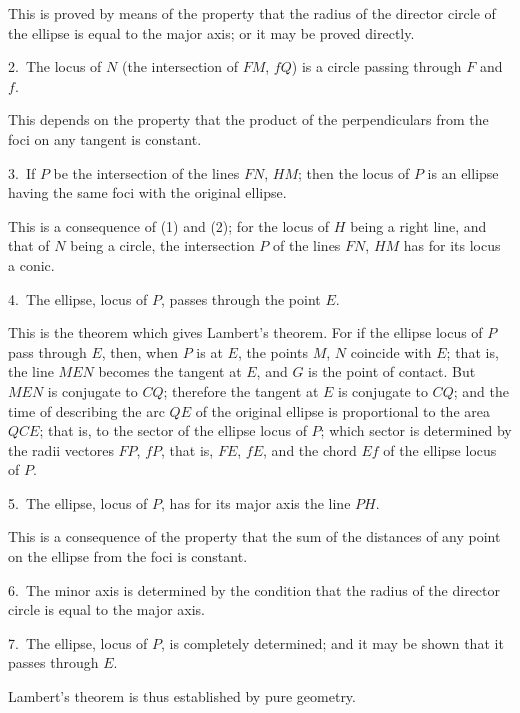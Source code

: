 \documentclass[11pt,a4paper]{book}
\providecommand{\mypar}{\par}
\begin{document}
{{\mypar
This is proved by means of the property that the radius of the director circle
of the ellipse is equal to the major axis; or it may be proved directly.

\mypar
2.~The locus of $N$ (the intersection of $FM$, $fQ$) is a circle passing
through $F$ and $f$.

\mypar
This depends on the property that the product of the perpendiculars from the
foci on any tangent is constant.

\mypar
3.~If $P$ be the intersection of the lines $FN$, $HM$; then the locus of $P$
is an ellipse having the same foci with the original ellipse.

\mypar
This is a consequence of (1) and (2); for the locus of $H$ being a right line,
and that of $N$ being a circle, the intersection $P$ of the lines $FN$, $HM$
has for its locus a conic.

\mypar
4.~The ellipse, locus of $P$, passes through the point $E$.

\mypar
This is the theorem which gives Lambert's theorem. For if the ellipse locus
of $P$ pass through $E$, then, when $P$ is at $E$, the points $M$, $N$ coincide
with $E$; that is, the line $MEN$ becomes the tangent at $E$, and $G$ is the
point of contact. But $MEN$ is conjugate to $CQ$; therefore the tangent at $E$
is conjugate to $CQ$; and the time of describing the arc $QE$ of the original
ellipse is proportional to the area $QCE$; that is, to the sector of the
ellipse locus of $P$; which sector is determined by the radii vectores $FP$,
$fP$, that is, $FE$, $fE$, and the chord $Ef$ of the ellipse locus of $P$.

\mypar
5.~The ellipse, locus of $P$, has for its major axis the line $PH$.

\mypar
This is a consequence of the property that the sum of the distances of any
point on the ellipse from the foci is constant.

\mypar
6.~The minor axis is determined by the condition that the radius of the
director circle is equal to the major axis.

\mypar
7.~The ellipse, locus of $P$, is completely determined; and it may be shown
that it passes through $E$.

\mypar
Lambert's theorem is thus established by pure geometry.

\clearpage


}}
\end{document}
